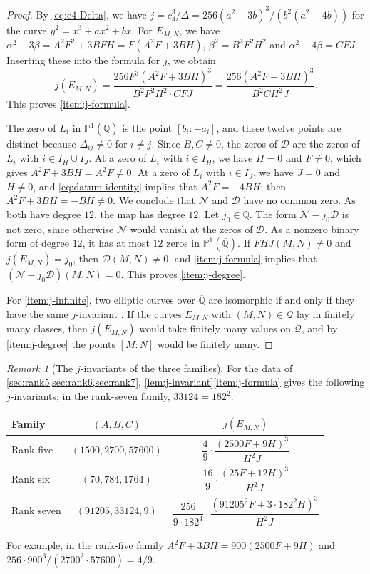 \documentclass[12pt,oneside,openany]{book}
\theoremstyle{definition}
\theoremstyle{plain}
\numberwithin{equation}{chapter}
\theoremstyle{plain}
\theoremstyle{definition}
\theoremstyle{remark}
\newtheorem{remark}[remark]{Remark}
\newcommand{\Q}{\mathbb Q}
\newcommand{\Qbar}{\overline{\mathbb Q}}
\begin{document}
\begin{proof}
By \eqref{eq:c4-Delta}, we have $j=c_4^3/\Delta=256(a^2-3b)^3/(b^2(a^2-4b))$ for the curve $y^2=x^3+ax^2+bx$. For $E_{M,N}$, we have $\alpha^2-3\beta=A^2F^2+3BFH=F(A^2F+3BH)$, $\beta^2=B^2F^2H^2$ and $\alpha^2-4\beta=CFJ$. Inserting these into the formula for $j$, we obtain
\begin{equation}
j(E_{M,N})=\frac{256F^3(A^2F+3BH)^3}{B^2F^2H^2\cdot CFJ}=\frac{256(A^2F+3BH)^3}{B^2CH^2J}.
\end{equation}
This proves \ref{item:j-formula}.

The zero of $L_i$ in $\mathbb P^1(\Qbar)$ is the point $[b_i:-a_i]$, and these twelve points are distinct because $\Delta_{ij}\ne0$ for $i\ne j$. Since $B,C\ne0$, the zeros of $\mathcal D$ are the zeros of $L_i$ with $i\in I_H\cup I_J$. At a zero of $L_i$ with $i\in I_H$, we have $H=0$ and $F\ne0$, which gives $A^2F+3BH=A^2F\ne0$. At a zero of $L_i$ with $i\in I_J$, we have $J=0$ and $H\ne0$, and \eqref{eq:datum-identity} implies that $A^2F=-4BH$; then $A^2F+3BH=-BH\ne0$. We conclude that $\mathcal N$ and $\mathcal D$ have no common zero. As both have degree $12$, the map has degree $12$. Let $j_0\in\Q$. The form $\mathcal N-j_0\mathcal D$ is not zero, since otherwise $\mathcal N$ would vanish at the zeros of $\mathcal D$. As a nonzero binary form of degree $12$, it has at most $12$ zeros in $\mathbb P^1(\Qbar)$. If $FHJ(M,N)\ne0$ and $j(E_{M,N})=j_0$, then $\mathcal D(M,N)\ne0$, and \ref{item:j-formula} implies that $(\mathcal N-j_0\mathcal D)(M,N)=0$. This proves \ref{item:j-degree}.

For \ref{item:j-infinite}, two elliptic curves over $\Qbar$ are isomorphic if and only if they have the same $j$-invariant \cite[Proposition~III.1.4(b)]{SilvermanAEC}. If the curves $E_{M,N}$ with $(M,N)\in\mathcal Q$ lay in finitely many classes, then $j(E_{M,N})$ would take finitely many values on $\mathcal Q$, and by \ref{item:j-degree} the points $[M:N]$ would be finitely many.
\end{proof}

\begin{remark}[The $j$-invariants of the three families]\label{rem:j-families}
For the data of \cref{sec:rank5,sec:rank6,sec:rank7}, \cref{lem:j-invariant}\ref{item:j-formula} gives the following $j$-invariants; in the rank-seven family, $33124=182^2$.
\begin{center}
\begin{tabular}{lcc}
\toprule
Family & $(A,B,C)$ & $j(E_{M,N})$\\
\midrule
Rank five & $(1500,2700,57600)$ & $\dfrac49\cdot\dfrac{(2500F+9H)^3}{H^2J}$\\[8pt]
Rank six & $(70,784,1764)$ & $\dfrac{16}9\cdot\dfrac{(25F+12H)^3}{H^2J}$\\[8pt]
Rank seven & $(91205,33124,9)$ & $\dfrac{256}{9\cdot182^4}\cdot\dfrac{(91205^2F+3\cdot182^2H)^3}{H^2J}$\\
\bottomrule
\end{tabular}
\end{center}
For example, in the rank-five family $A^2F+3BH=900(2500F+9H)$ and $256\cdot900^3/(2700^2\cdot57600)=4/9$.
\end{remark}
\end{document}
